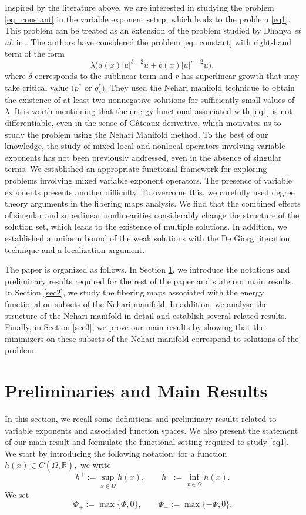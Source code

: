 \documentclass[11pt]{article}
\newcommand{\om} {\Omega}
\newcommand{\la} {\lambda}
\newcommand{\oline} {\overline}
\newcommand{\real}{\mathbb{R}}
\begin{document}
Inspired by the literature above,
we are interested in studying the problem
\eqref{eq_constant} in the variable exponent setup,
which leads to the problem
\eqref{eq1}.
This problem can be treated as an extension of 
the problem studied by Dhanya \textit{et al.} in
\cite{dhanya2025multiplicityresultsmixedlocal}.
The authors have considered the problem
\eqref{eq_constant} with right-hand term of the form
$$
\la\big(a(x) |u|^{\delta -2}u + b(x) |u|^{r-2}u\big),
$$
where
$\delta$
corresponds to the sublinear term and
$r$
has superlinear growth that may take critical value
$(p^*$
or
$q^*_s).$
They used the Nehari manifold technique to obtain the 
existence of at least two nonnegative solutions for 
sufficiently small values of
$\la.$
It is worth mentioning that the energy functional associated 
with \eqref{eq1} is not differentiable, even in the sense of 
G\^ateaux derivative, which motivates us to study the problem 
using the Nehari Manifold method.
To the best of our knowledge, the study of mixed local and 
nonlocal operators involving variable exponents has not been 
previously addressed, even in the absence of singular terms.
We established an appropriate functional framework for 
exploring problems involving mixed variable exponent 
operators.
The presence of variable exponents presents another 
difficulty.
To overcome this, we carefully used degree theory arguments 
in the fibering maps analysis.
We find that the combined effects of singular and 
superlinear 
nonlinearities considerably change the structure of the 
solution set, which leads to the existence of multiple 
solutions.
In addition, we established a uniform bound of the weak 
solutions with the De Giorgi iteration technique and a 
localization argument.

The paper is organized as follows.
In Section \ref{sec1}, we introduce the 
notations and preliminary results required 
for the rest of the paper and state our main results.
In Section \ref{sec2}, we study the fibering maps 
associated with the energy functional on subsets of 
the Nehari manifold.
In addition, we analyse the structure of the Nehari 
manifold in detail and establish several related results.
Finally, in Section \ref{sec3}, we prove our main 
results by showing that the minimizers on these 
subsets of the Nehari manifold correspond to 
solutions of the problem.


\section{Preliminaries and Main Results}\label{sec1}
In this section, we recall some definitions 
and preliminary results related to variable 
exponents and associated function spaces.
We also present the statement of our main 
result and formulate the functional setting 
required to study \eqref{eq1}.
We start by introducing the following notation: 
for a function
$h(x)\in C(\oline\om,\real),$
we write
$$
h^+:=\sup_{x\in\oline\om}h(x), 
\qquad h^-:=\inf_{x\in \oline\om}h(x).
$$
We set 
$$
\Phi_+:=\max\{\Phi,0\}, \qquad
 \Phi_-:=\max\{-\Phi,0\}.
$$
\end{document}
